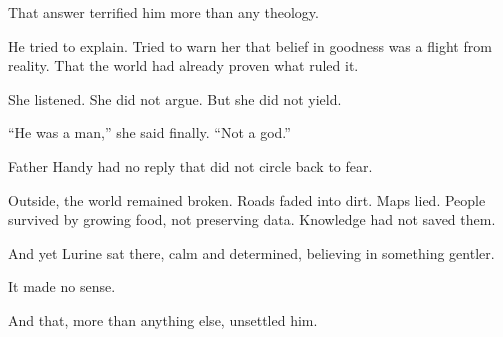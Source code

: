 That answer terrified him more than any theology.

He tried to explain. Tried to warn her that belief in goodness was a flight from reality. That the world had already proven what ruled it.

She listened. She did not argue. But she did not yield.

“He was a man,” she said finally. “Not a god.”

Father Handy had no reply that did not circle back to fear.

Outside, the world remained broken. Roads faded into dirt. Maps lied. People survived by growing food, not preserving data. Knowledge had not saved them.

And yet Lurine sat there, calm and determined, believing in something gentler.

It made no sense.

And that, more than anything else, unsettled him.

